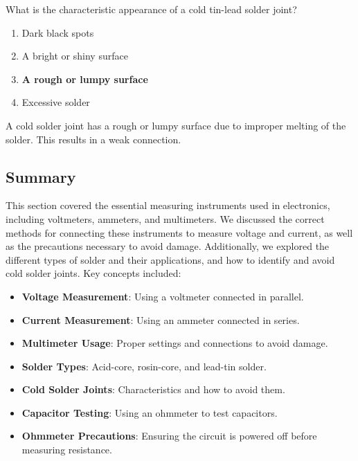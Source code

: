 \begin{tcolorbox}[colback=gray!10!white,colframe=black!75!black,title={T7D09}]
    What is the characteristic appearance of a cold tin-lead solder joint?
    \begin{enumerate}[label=\Alph*),noitemsep]
        \item Dark black spots
        \item A bright or shiny surface
        \item \textbf{A rough or lumpy surface}
        \item Excessive solder
    \end{enumerate}
\end{tcolorbox}
A cold solder joint has a rough or lumpy surface due to improper melting of the solder. This results in a weak connection.

\subsection*{Summary}
This section covered the essential measuring instruments used in electronics, including voltmeters, ammeters, and multimeters. We discussed the correct methods for connecting these instruments to measure voltage and current, as well as the precautions necessary to avoid damage. Additionally, we explored the different types of solder and their applications, and how to identify and avoid cold solder joints. Key concepts included:
\begin{itemize}
    \item \textbf{Voltage Measurement}: Using a voltmeter connected in parallel.
    \item \textbf{Current Measurement}: Using an ammeter connected in series.
    \item \textbf{Multimeter Usage}: Proper settings and connections to avoid damage.
    \item \textbf{Solder Types}: Acid-core, rosin-core, and lead-tin solder.
    \item \textbf{Cold Solder Joints}: Characteristics and how to avoid them.
    \item \textbf{Capacitor Testing}: Using an ohmmeter to test capacitors.
    \item \textbf{Ohmmeter Precautions}: Ensuring the circuit is powered off before measuring resistance.
\end{itemize}
